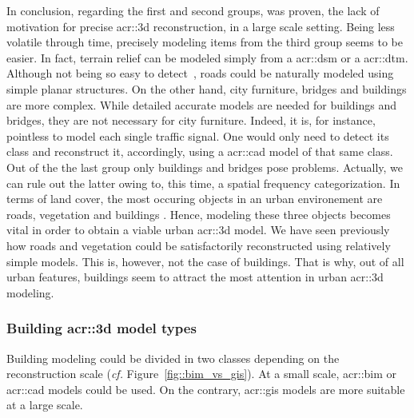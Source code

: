             In conclusion, regarding the first and second groups, was proven, the lack of motivation for precise \gls{acr::3d} reconstruction, in a large scale setting.
            Being less volatile through time, precisely modeling items from the third group seems to be easier.
            In fact, terrain relief can be modeled simply from a \gls{acr::dsm} or a \gls{acr::dtm}.
            Although not being so easy to detect~\parencite{mnih2010learning}, roads could be naturally modeled using simple planar structures.
            On the other hand, city furniture, bridges and buildings are more complex.
            While detailed accurate models are needed for buildings and bridges, they are not necessary for city furniture.
            Indeed, it is, for instance, pointless to model each single traffic signal.
            One would only need to detect its class and reconstruct it, accordingly, using a \gls{acr::cad} model of that same class.\\
            Out of the the last group only buildings and bridges pose problems.
            Actually, we can rule out the latter owing to, this time, a spatial frequency categorization.
            In terms of land cover, the most occuring objects in an urban environement are roads, vegetation and buildings \addref.
            Hence, modeling these three objects becomes vital in order to obtain a viable urban \gls{acr::3d} model.
            We have seen previously how roads and vegetation could be satisfactorily reconstructed using relatively simple models.
            This is, however, not the case of buildings.
            That is why, out of all urban features, buildings seem to attract the most attention in urban \gls{acr::3d} modeling.

        \subsubsection{Building \gls*{acr::3d} model types}
            Building modeling could be divided in two classes depending on the reconstruction scale (\textit{cf.} Figure~\ref{fig::bim_vs_gis}).
            At a small scale, \gls{acr::bim} or \gls{acr::cad} models could be used.
            On the contrary, \gls{acr::gis} models are more suitable at a large scale.\\


